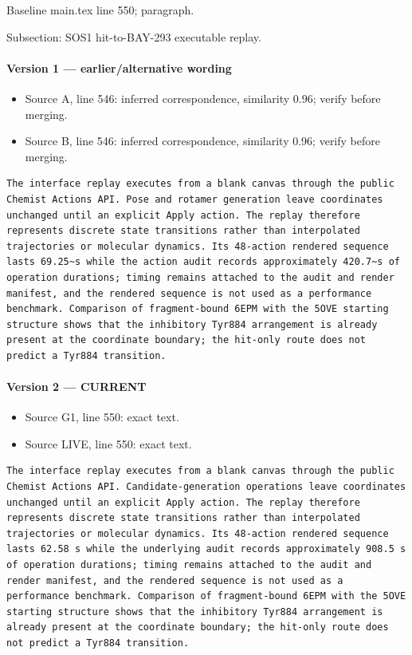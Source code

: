 \documentclass[11pt]{article}
\begin{document}
Baseline main.tex line 550; paragraph.

Subsection: SOS1 hit-to-BAY-293 executable replay.

\paragraph{Version 1 --- earlier/alternative wording}

\begin{itemize}[leftmargin=*]
\item Source A, line 546: inferred correspondence, similarity 0.96; verify before merging.
\item Source B, line 546: inferred correspondence, similarity 0.96; verify before merging.
\end{itemize}

\begin{lstlisting}
The interface replay executes from a blank canvas through the public Chemist Actions API. Pose and rotamer generation leave coordinates unchanged until an explicit Apply action. The replay therefore represents discrete state transitions rather than interpolated trajectories or molecular dynamics. Its 48-action rendered sequence lasts 69.25~s while the action audit records approximately 420.7~s of operation durations; timing remains attached to the audit and render manifest, and the rendered sequence is not used as a performance benchmark. Comparison of fragment-bound 6EPM with the 5OVE starting structure shows that the inhibitory Tyr884 arrangement is already present at the coordinate boundary; the hit-only route does not predict a Tyr884 transition.
\end{lstlisting}

\paragraph{Version 2 --- CURRENT}

\begin{itemize}[leftmargin=*]
\item Source G1, line 550: exact text.
\item Source LIVE, line 550: exact text.
\end{itemize}

\begin{lstlisting}
The interface replay executes from a blank canvas through the public Chemist Actions API. Candidate-generation operations leave coordinates unchanged until an explicit Apply action. The replay therefore represents discrete state transitions rather than interpolated trajectories or molecular dynamics. Its 48-action rendered sequence lasts 62.58 s while the underlying audit records approximately 908.5 s of operation durations; timing remains attached to the audit and render manifest, and the rendered sequence is not used as a performance benchmark. Comparison of fragment-bound 6EPM with the 5OVE starting structure shows that the inhibitory Tyr884 arrangement is already present at the coordinate boundary; the hit-only route does not predict a Tyr884 transition.
\end{lstlisting}
\end{document}
